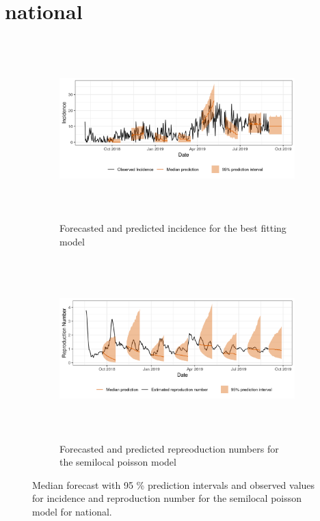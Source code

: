  \section{ national }\begin{figure}[H]\begin{subfigure}{\textwidth}  \centering  \includegraphics[width=0.9\linewidth, height=7cm]{../output/national_predictions.png}  \caption{Forecasted and predicted incidence for the best fitting model}\end{subfigure}

\begin{subfigure}{\textwidth}  \centering  \includegraphics[width=0.9\linewidth, height=7cm]{../output/national_Rs.png}  \caption{Forecasted and predicted repreoduction numbers for the semilocal poisson model}\end{subfigure}  \caption{Median forecast with 95 \% prediction intervals and observed values for incidence and reproduction number for the semilocal poisson model for national.}\end{figure}


